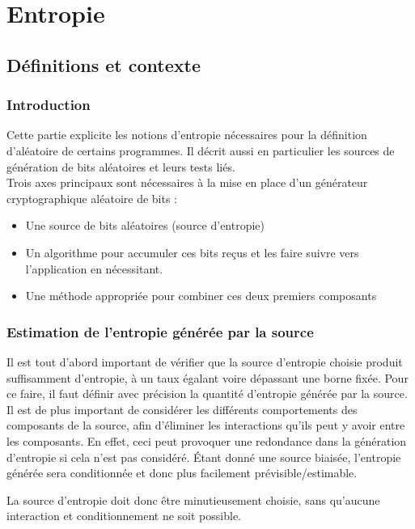 \chapter{Entropie}
\section{Définitions et contexte}

\subsection{Introduction}
Cette partie explicite les notions d'entropie nécessaires pour la définition d'aléatoire de certains programmes. Il décrit aussi en particulier les sources de génération de bits aléatoires et leurs tests liés. \\



Trois axes principaux sont nécessaires à la mise en place d'un générateur cryptographique aléatoire de bits : 
\begin{itemize}
\item Une source de bits aléatoires (source d'entropie)
\item Un algorithme pour accumuler ces bits reçus et les faire suivre vers l'application en nécessitant.
\item Une méthode appropriée pour combiner ces deux premiers composants\\
\end{itemize}


\subsection{Estimation de l'entropie générée par la source}
Il est tout d'abord important de vérifier que la source d'entropie choisie produit suffisamment d'entropie, à un taux égalant voire dépassant une borne fixée. Pour ce faire, il faut définir avec précision la quantité d'entropie générée par la source. Il est de plus important de considérer les différents comportements des composants de la source, afin d'éliminer les interactions qu'ils peut y avoir entre les composants. En effet, ceci peut provoquer une redondance dans la génération d'entropie si cela n'est pas considéré. Étant donné une source biaisée, l'entropie générée sera conditionnée et donc plus facilement prévisible/estimable.

La source d'entropie doit donc être minutieusement choisie, sans qu'aucune interaction et conditionnement ne soit possible.

